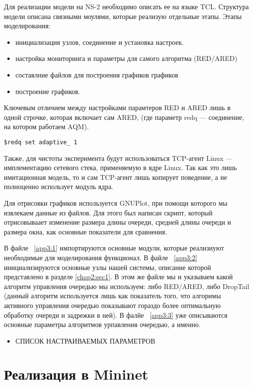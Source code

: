 Для реализации модели на NS-2 необходимо описать ее на языке TCL. Структура
модели описана связными моулями, которые реализую отдельные этапы. Этапы
моделирования:

\begin{itemize}
        \item инициализация узлов, соединение и установка настроек.
        \item настройка мониторинга и параметры для самого алгоритма (RED/ARED)
        \item составлние файлов для построения графиков графиков
        \item построение графиков.
\end{itemize}

Ключевым отличием между настройками парамтеров RED и ARED лишь в одной строчке,
которая включает сам ARED, (где параметр redq --- соединение, на котором
работаем AQM).

\begin{verbatim}
$redq set adaptive_ 1
\end{verbatim}

Также, для чистоты эксперимента будут использоваться TCP-агент Linux ---
имплементацию сетевого стека, применяемую в ядре Linux. Так как это лишь
имитационная модель, то и сам TCP-агент лишь копирует поведение, а не
полноценно использует модуль ядра.

Для отрисовки графиков используется GNUPlot, при помощи которого мы извлекаем
данные из файлов. Для этого был написан скрипт, который отрисовываает изменение
размера длины очереди, средней длины очереди и размера окна, как основные
показатели для сравнения.

В файле ~\ref{app3:1} импортируются основные модули, которые реализиуют необходимые для моделирования функционал.
В файле ~\ref{app3:2} инициализируются основные узлы нашей системы, описание которой представлено в разделе \ref{chap2:sec1}. В этом же файле мы и указываем какой алгоритм управления очередью мы используем: либо RED/ARED, либо DropTail (данный алгоритм используется лишь как показатель того, что алгоримы активного управления очередью показывают гораздо более оптимальную обработку очереди и задрежки в ней). 
В фалйе ~\ref{app3:3} уже описываются основные параметры алгоритмов урпавления очередью, а именно. 

\begin{itemize}
        \item СПИСОК НАСТРАИВАЕМЫХ ПАРАМЕТРОВ
\end{itemize}


\section{Реализация в Mininet} %
\label{chap2:sec3}




